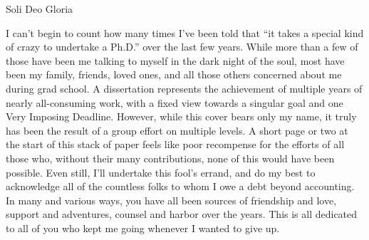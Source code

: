 \documentclass[
]{ucbthesis}
\begin{document}
\begin{frontmatter}

\begin{dedication}
\null\vfil
\begin{center}

Soli Deo Gloria
\end{center}
\vfil\null
\end{dedication}


\tableofcontents
\clearpage
\listoffigures
\clearpage
\listoftables

\begin{acknowledgements}

I can't begin to count how many times I've been told that \enquote{it takes a special kind of crazy to undertake a Ph.D.}  over the last few years.
While more than a few of those have been me talking to myself in the dark night of the soul, most have been my family, friends, loved ones, and all those others concerned about me during grad school.
A dissertation represents the achievement of multiple years of  nearly all-consuming work, with a fixed view towards a singular goal and one Very Imposing Deadline. 
However, while this cover bears only my name, it truly has been the result of a group effort on multiple levels.
A short page or two at the start of this stack of paper feels like poor recompense for the efforts of all those who, without their many contributions, none of this would have been possible.
Even still, I'll undertake this fool's errand, and do my best to acknowledge all of the countless folks to whom I owe a debt beyond accounting.
In many and various ways, you have all been sources of friendship and love, support and adventures, counsel and harbor over the years.
This is all dedicated to all of you  who kept me going whenever I wanted to give up.




\end{acknowledgements}
\end{frontmatter}
\end{document}
